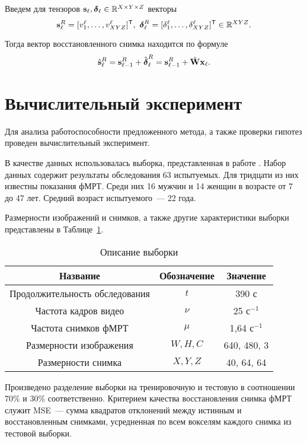\documentclass[a4paper, 12pt]{article}
\begin{document}
	Введем для тензоров $\mathbf{s}_{\ell}, \boldsymbol{\delta}_{\ell} \in \mathbb{R}^{X \times Y \times Z}$ векторы
	\[ \mathbf{s}_{\ell}^{R} = [ v^{\ell}_1, \ldots, v^{\ell}_{XYZ} ]^{\mathsf{T}},\
	\boldsymbol{\delta}_{\ell}^{R} = [ \delta^{\ell}_1, \ldots, \delta^{\ell}_{XYZ} ]^{\mathsf{T}} \in \mathbb{R}^{XYZ}. \]

	Тогда вектор восстановленного снимка находится по формуле
	\begin{equation}
		\label{eq14}
		\hat{\mathbf{s}}_{\ell}^{R} = \mathbf{s}_{\ell-1}^{R} + \hat{\boldsymbol{\delta}}_{\ell}^{R} = \mathbf{s}_{\ell-1}^{R} + \hat{\mathbf{W}} \mathbf{x}_{\ell}.
	\end{equation}

\section{Вычислительный эксперимент}

	Для анализа работоспособности предложенного метода, а также проверки гипотез 
	проведен вычислительный эксперимент.

	В качестве данных использовалась выборка, представленная в работе \citep{Berezutskaya2022}.
	Набор данных содержит результаты обследования 63 испытуемых.
	Для тридцати из них известны показания фМРТ.
	Среди них 16 мужчин и 14 женщин в возрасте от 7 до 47 лет.
	Средний возраст испытуемого~--- 22 года.

	Размерности изображений и снимков, а также другие характеристики выборки представлены в 
	Таблице~\ref{table:sample}.

	\begin{table}
		\centering
		\begin{tabular}{|c|c|c|}
			\hline
			Название & Обозначение & Значение \\
			\hline \hline
			Продолжительность обследования & $t$ & 390 с \\ \hline
			Частота кадров видео & $\nu$ & 25 $\text{с}^{-1}$ \\ \hline
			Частота снимков фМРТ & $\mu$ & 1,64 $\text{с}^{-1}$ \\ \hline
			Размерности изображения & $W, H, C$ & 640, 480, 3 \\ \hline
			Размерности снимка & $X, Y, Z$ & 40, 64, 64 \\ \hline
		\end{tabular}
		\caption{Описание выборки}
		\label{table:sample}
	\end{table}

	Произведено разделение выборки на тренировочную и тестовую в соотношении 70\% и 30\% соответственно.
	Критерием качества восстановления снимка фМРТ служит MSE~--- сумма квадратов отклонений 
	между истинным и восстановленным снимками, усредненная по всем вокселям каждого снимка
	из тестовой выборки.
\end{document}
